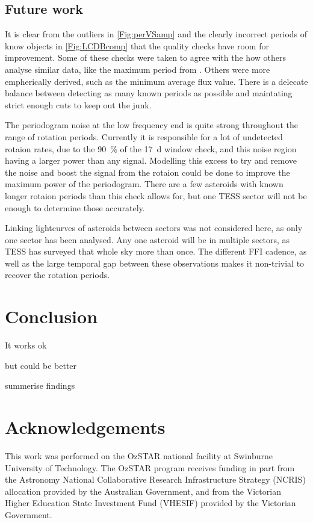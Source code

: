 \documentclass{UCreport}
\begin{document}
\subsection{Future work}

It is clear from the outliers in \autoref{Fig:perVSamp} and the clearly incorrect periods of know objects in \autoref{Fig:LCDBcomp} that the quality checks have room for improvement.
Some of these checks were  taken to agree with the how others analyse similar data, like the maximum period from \citet{McNeill2023}.
Others were more empherically derived, such as the minimum average flux value.
There is a delecate balance between detecting as many known periods as possible and maintating strict enough cuts to keep out the junk.

The periodogram noise at the low frequency end is quite strong throughout the range of rotation periods. 
Currently it is responsible for a lot of undetected rotaion rates, due to the \qty{90}{\percent} of the \qty{17}{\day} window check, and this noise region having a larger power than any signal.
Modelling this excess to try and remove the noise and boost the signal from the rotaion could be done to improve the maximum power of the periodogram. 
There are a few asteroids with known longer rotaion periods than this check allows for, but one TESS sector will not be enough to determine those accurately.

Linking lightcurves of asteroids between sectors was not considered here, as only one sector has been analysed.
Any one asteroid will be in multiple sectors, as TESS has surveyed that whole sky more than once. 
The different FFI cadence, as well as the large temporal gap between these observations makes it non-trivial to recover the rotation periods.



\section{Conclusion}\label{Sec:Conc}

It works ok

but could be better

summerise findings

\newpage %

\section*{Acknowledgements}
\small
This work was performed on the OzSTAR national facility at Swinburne University of Technology.
The OzSTAR program receives funding in part from the Astronomy National Collaborative Research Infrastructure Strategy (NCRIS) allocation provided by the Australian Government, and from the Victorian Higher Education State Investment Fund (VHESIF) provided by the Victorian Government.
\end{document}
